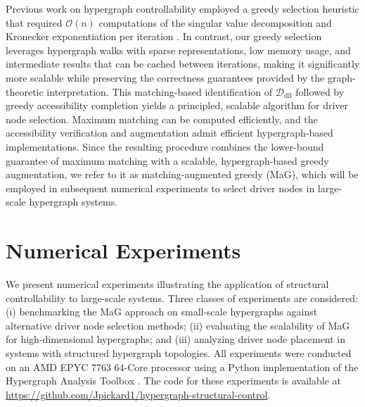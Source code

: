 \documentclass[journal,twoside,web]{ieeecolor}
\newcommand{\Ds}{\mathcal{D}}
\newcommand{\Os}{\mathcal{O}}
\begin{document}
Previous work on hypergraph controllability employed a greedy selection heuristic that required \(\Os(n)\) computations of the singular value decomposition and Kronecker exponentiation per iteration \cite{chen2021controllability}. In contrast, our greedy selection leverages hypergraph walks with sparse representations, low memory usage, and intermediate results that can be cached between iterations, making it significantly more scalable while preserving the correctness guarantees provided by the graph-theoretic interpretation.
%
This matching-based identification of $\Ds_{\mathrm{dil}}$ followed by greedy accessibility completion yields a principled, scalable algorithm for driver node selection. Maximum matching can be computed efficiently, and the accessibility verification and augmentation admit efficient hypergraph-based implementations. Since the resulting procedure combines the lower-bound guarantee of maximum matching with a scalable, hypergraph-based greedy augmentation, we refer to it as matching-augmented greedy (MaG), which will be employed in subsequent numerical experiments to select driver nodes in large-scale hypergraph systems.



\section{Numerical Experiments}
\label{sec:numerical_experiments}

We present numerical experiments illustrating the application of structural controllability to large-scale systems.
%
Three classes of experiments are considered: (i) benchmarking the MaG approach on small-scale hypergraphs against alternative driver node selection methods; (ii) evaluating the scalability of MaG for high-dimensional hypergraphs; and (iii) analyzing driver node placement in systems with structured hypergraph topologies.  
%
All experiments were conducted on an AMD EPYC 7763 64-Core processor using a Python implementation of the Hypergraph Analysis Toolbox \cite{pickard2023hat}. The code for  these experiments
is available at \url{https://github.com/Jpickard1/hypergraph-structural-control}.
\end{document}
